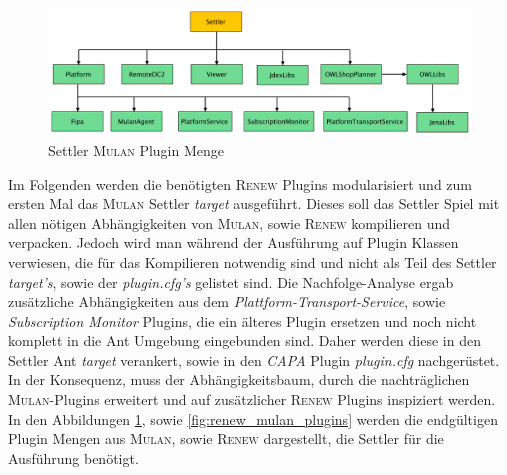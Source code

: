 	\begin{figure}[h!]
	  \centering
	  \includegraphics[width=\textwidth]{material/images/settler-mulan-plugins.pdf}
	  \caption{Settler \textsc{Mulan} Plugin Menge}
	  \label{fig:settler_mulan_plugins}
	\end{figure}

	Im Folgenden werden die benötigten \textsc{Renew} Plugins modularisiert und zum ersten Mal das \textsc{Mulan} Settler \textit{target} ausgeführt. Dieses soll das Settler Spiel mit allen nötigen Abhängigkeiten von \textsc{Mulan}, sowie \textsc{Renew} kompilieren und verpacken. Jedoch wird man während der Ausführung auf Plugin Klassen verwiesen, die für das Kompilieren notwendig sind und nicht als Teil des Settler \textit{target's}, sowie der \textit{plugin.cfg's} gelistet sind. \newline
	Die Nachfolge-Analyse ergab zusätzliche Abhängigkeiten aus dem \textit{Plattform-Transport-Service}, sowie \textit{Subscription Monitor} Plugins, die ein älteres Plugin ersetzen und noch nicht komplett in die Ant Umgebung eingebunden sind. Daher werden diese in den Settler Ant \textit{target} verankert, sowie in den \textit{CAPA} Plugin \textit{plugin.cfg} nachgerüstet. In der Konsequenz, muss der Abhängigkeitsbaum, durch die nachträglichen \textsc{Mulan}-Plugins erweitert und auf zusätzlicher \textsc{Renew} Plugins inspiziert werden. \newline
	In den Abbildungen \ref{fig:settler_mulan_plugins}, sowie \ref{fig:renew_mulan_plugins} werden die endgültigen Plugin Mengen aus \textsc{Mulan}, sowie \textsc{Renew} dargestellt, die Settler für die Ausführung benötigt. \bigbreak

